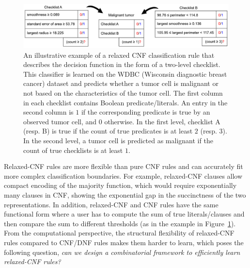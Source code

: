 \begin{figure}
	\begin{center}
		\includegraphics[scale=.7]{figures/interpretability/relaxed-cnf/checklist.pdf}
	\end{center}
	\caption{An illustrative example of a  relaxed CNF classification rule that describes the decision function in the form of a  two-level checklist. This classifier is learned on the WDBC (Wisconsin diagnostic breast cancer) dataset and predicts whether a tumor cell is malignant or not based on the characteristics of the  tumor cell. The first column in each checklist contains Boolean predicate/literals. An entry in the second column is  $ 1 $ if the corresponding predicate is true by an observed tumor cell, and $ 0 $ otherwise. In the first level, checklist A (resp. B) is true if the count of true  predicates is at least $ 2 $ (resp. $ 3 $). In the second level, a tumor cell is predicted as malignant if the count of true checklists is at least $ 1 $. }
	\label{interpretability_crr_exmpl:wdbc}
\end{figure}




 {Relaxed-CNF rules are  more flexible than pure CNF rules and  can accurately fit more complex classification boundaries.} For example, relaxed-CNF clauses  allow  compact encoding of the majority function, which would require exponentially many clauses in CNF, showing the exponential gap in the succinctness of the two representations.  In addition, relaxed-CNF and CNF rules have the same functional form where a user has to compute the sum of true literals/clauses  and then compare the sum  to  different thresholds {(as in the example in Figure~\ref{interpretability_crr_exmpl:wdbc})}. From the computational perspective, the structural flexibility of relaxed-CNF rules compared to CNF/DNF rules makes them harder to learn, which poses the following question, \textit{can we design a combinatorial framework to efficiently learn relaxed-CNF rules?}

